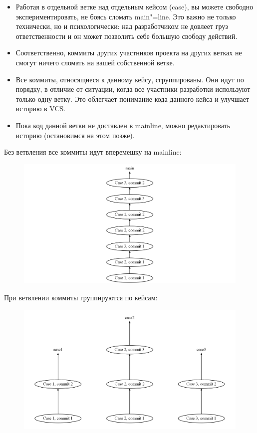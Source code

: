 \documentclass[10pt, a5paper]{article}
\begin{document}
\begin{itemize}
  \item Работая в отдельной ветке над отдельным кейсом (case), вы можете свободно экспериментировать, не боясь сломать main"=line. Это важно не только технически, но и психологически: над разработчиком не довлеет груз ответственности и он может позволить себе большую свободу действий.
  \item Соответственно, коммиты других участников проекта на других ветках не смогут ничего сломать на вашей собственной ветке.
  \item Все коммиты, относящиеся к данному кейсу, сгруппированы. Они идут по порядку, в отличие от ситуации, когда все участники разработки используют только одну ветку. Это облегчает понимание кода данного кейса и улучшает историю в VCS.
  \item Пока код данной ветки не доставлен в mainline, можно редактировать историю (остановимся на этом позже).
\end{itemize}

Без ветвления все коммиты идут вперемешку на mainline:
\begin{figure}[h!]
  \centering
  \includegraphics[scale=0.2]{02_2014_only-main.png}
\end{figure}

При ветвлении коммиты группируются по кейсам:
\begin{figure}[h!]
  \centering
  \includegraphics[scale=0.2]{02_2014_branches.png}
\end{figure}
\end{document}
